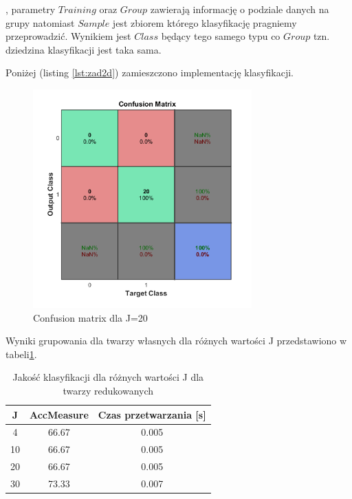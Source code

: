 \documentclass[11pt, a4paper]{article}
\newcommand{\fbi}{\leavevmode{\parindent=1em\indent}}
\begin{document}
, parametry $Training$ oraz $Group$ zawierają informację o podziale danych na grupy natomiast $Sample$ jest zbiorem którego klasyfikację pragniemy przeprowadzić. Wynikiem jest $Class$ będący tego samego typu co $Group$ tzn. dziedzina klasyfikacji jest taka sama.

Poniżej (listing \ref{lst:zad2d}) zamieszczono implementację klasyfikacji.




\begin{figure}[H]
	\centering
	\includegraphics[width=0.75\textwidth]{./assets/ilustracja_zad2_conf_j20.png}
	\caption{Confusion matrix dla J=20}
	\label{fig:ilustracja_zad2_conf_j20}
\end{figure}


\fbi
Wyniki grupowania dla twarzy własnych dla różnych wartości J przedstawiono w tabeli\ref{tab:wynikiKlasyfikacjaRedukowane}.

\begin{table}[H]
	\centering
	\caption{Jakość klasyfikacji dla różnych wartości J dla twarzy redukowanych}
	\begin{tabular}{|c|c|c|}
		\hline 
		J & AccMeasure & Czas przetwarzania [s] \\ 
		\hline
		4 & 66.67 & 0.005 \\
		\hline
		10 & 66.67 & 0.005 \\
		\hline
		20 & 66.67 & 0.005 \\
		\hline
		30 & 73.33 & 0.007 \\
		\hline
	\end{tabular}
	\label{tab:wynikiKlasyfikacjaRedukowane}
\end{table}
\end{document}
